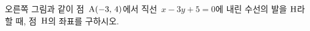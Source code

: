 \noindent\begin{minipage}[t]{0.58\linewidth}\vspace{0pt}\raggedright 오른쪽 그림과 같이 점~$\mathrm{A}(-3,\mkern3mu 4)$에서 직선~$x-3y+5=0$에 내린 수선의 발을 $\mathrm{H}$라 할 때, 점~$\mathrm{H}$의 좌표를 구하시오.\end{minipage}\hfill\begin{minipage}[t]{0.4\linewidth}\vspace{0pt}\centering \resizebox{\ifdim\width>\linewidth\linewidth\else\width\fi}{!}{}\end{minipage}\par
